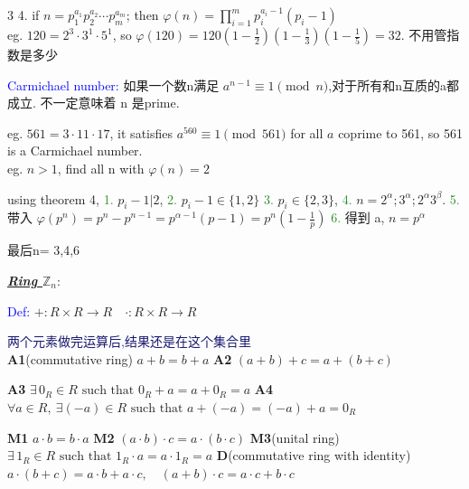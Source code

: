 \documentclass[12pt]{article}
\newcommand{\bulletPoint}[1]{\underline{\textit{\textbf{#1}}}}
\begin{document}
\begin{multicols*}{3}
4. \textcolor{magenta!90!black}{if $n=p_1^{a_1}p_2^{a_2}\cdots p_m^{a_m}$; then $\varphi(n)=\prod_{i=1}^m p_i^{a_i-1}(p_i-1)$} \\[3pt]



eg. $120 = 2^3·3^1·5^1$, so $\varphi(120)=120\left(1-\frac{1}{2}\right)\left(1-\frac{1}{3}\right)\left(1-\frac{1}{5}\right)=32.$ 不用管指数是多少

\textcolor{blue}{Carmichael number:} 如果一个数n满足 $a^{n-1}\equiv 1\pmod n$,对于所有和n互质的a都成立. 不一定意味着 n 是prime. 

eg. $561=3\cdot 11\cdot 17$, it satisfies $a^{560}\equiv 1\pmod{561}$ for all $a$ coprime to 561, so 561 is a Carmichael number. \\[3pt]

eg. $n>1$, find all n with $\varphi(n)=2$ 

using theorem 4, \textcolor{ForestGreen}{1.} $p_i-1|2$,   \textcolor{ForestGreen}{2.} $p_i-1\in\{1,2\}$ 
\textcolor{ForestGreen}{3.} $p_i\in\{2,3\}$, \textcolor{ForestGreen}{4.} $n=2^\alpha; 3^\alpha; 2^\alpha 3^\beta $. 
\textcolor{ForestGreen}{5.} 带入 $\varphi(p^n)=p^n-p^{n-1}=p^{\alpha-1}(p-1)=p^n(1-\frac{1}{p})$
\textcolor{ForestGreen}{6.} 得到 a, $n=p^\alpha$

最后n= 3,4,6


\bulletPoint{Ring $\mathbb{Z}_n$}:

\textcolor{blue}{Def:} $+ : R \times R \to R
\quad
\cdot : R \times R \to R$ 

{\fontsize{5.5pt}{5pt}\selectfont\textcolor{MidnightBlue}{两个元素做完运算后,结果还是在这个集合里}} \\[2pt]

\textcolor{magenta!90!black}{\textbf{A1}(commutative ring)} $ a+b=b+a $
\textcolor{magenta!90!black}{\textbf{A2}} $ (a+b)+c=a+(b+c) $

\textcolor{magenta!90!black}{\textbf{A3}} $\exists\,0_R\in R \text{ such that } 0_R+a=a+0_R=a $
\textcolor{magenta!90!black}{\textbf{A4}} $\forall a\in R,\ \exists(-a)\in R \text{ such that } 
a+(-a)=(-a)+a=0_R $

\textcolor{magenta!90!black}{\textbf{M1}} $ a\cdot b=b\cdot a $
\textcolor{magenta!90!black}{\textbf{M2}} $(a\cdot b)\cdot c=a\cdot(b\cdot c)$
\textcolor{magenta!90!black}{\textbf{M3}(unital ring)} $\exists\,1_R\in R \text{ such that } 1_R\cdot a=a\cdot1_R=a$
\textcolor{magenta!90!black}{\textbf{D}(commutative ring with identity)}  $a\cdot(b+c)=a\cdot b+a\cdot c,\quad
(a+b)\cdot c=a\cdot c+b\cdot c$ \\[2pt]



\end{multicols*}
\end{document}
